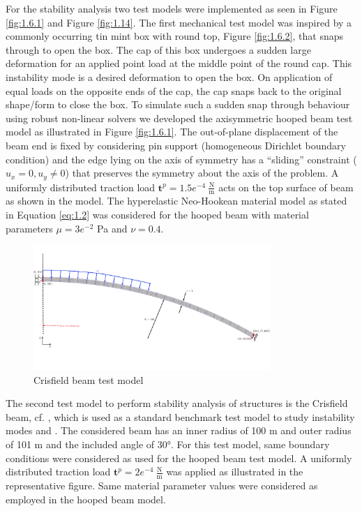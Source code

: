 \documentclass[11pt,a4paper,final]{article}
\begin{document}
For the stability analysis two test models were implemented as seen in Figure \eqref{fig:1.6.1} and Figure \eqref{fig:1.14}. The first mechanical test model was inspired by a commonly occurring tin mint box with round top, Figure \eqref{fig:1.6.2}, that snaps through to open the box. The cap of this box undergoes a sudden large deformation for an applied point load at the middle point of the round cap. This instability mode is a desired deformation to open the box. On application of equal loads on the opposite ends of the cap, the cap snaps back to the original shape/form to close the box. To simulate such a sudden snap through behaviour using robust non-linear solvers we developed the axisymmetric hooped beam test model as illustrated in Figure \eqref{fig:1.6.1}. The out-of-plane displacement of the beam end is fixed by considering pin support (homogeneous Dirichlet boundary condition) and the edge lying on the axis of symmetry has a ``sliding'' constraint ($u_x = 0, u_y \neq 0$) that preserves the symmetry about the axis of the problem. A uniformly distributed traction load $\mathbf{t}^p = 1.5e^{-4} \ \frac{\text{N}}{\text{m}}$ acts on the top surface of beam as shown in the model. The hyperelastic Neo-Hookean material model as stated in Equation \eqref{eq:1.2} was considered for the hooped beam with material parameters $\mu = 3e^{-2}$ Pa and $\nu = 0.4$.\par 

\begin{figure}[ht!]
\centering
\includegraphics[width=0.8\textwidth]{crisfield_beam.pdf}
\caption{Crisfield beam test model}
\label{fig:1.14}
\end{figure}

The second test model to perform stability analysis of structures is the Crisfield beam, cf. , which is used as a standard benchmark test model to study instability modes \cite[see][page 170]{Wriggers2008} and \cite{Hrinda2010}. The considered beam has an inner radius of 100 m and outer radius of 101 m and the included angle of $\ang{30}$. For this test model, same boundary conditions were considered as used for the hooped beam test model. A uniformly distributed traction load $\mathbf{t}^p = 2e^{-4} \ \frac{\text{N}}{\text{m}}$ was applied as illustrated in the representative figure. Same material parameter values were considered as employed in the hooped beam model. \par 
\end{document}
